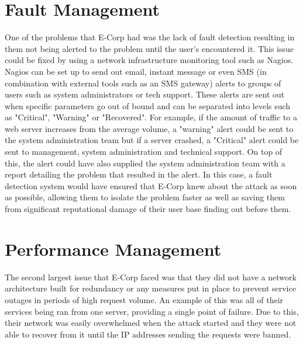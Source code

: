 \documentclass[]{report}
\begin{document}
\section*{Fault Management}
One of the problems that E-Corp had was the lack of fault detection resulting in them not being alerted to the problem until the user's encountered it. This issue could be fixed by using a network infrastructure monitoring tool such as Nagios. Nagios can be set up to send out email, instant message or even SMS (in combination with external tools such as an SMS gateway) alerts to groups of users such as system administrators or tech support. These alerts are sent out when specific parameters go out of bound and can be separated into levels such as "Critical", "Warning" or "Recovered". For example, if the amount of traffic to a web server increases from the average volume, a "warning" alert could be sent to the system administration team but if a server crashed, a "Critical" alert could be sent to management, system administration and technical support. On top of this, the alert could have also supplied the system administration team with a report detailing the problem that resulted in the alert. In this case, a fault detection system would have ensured that E-Corp knew about the attack as soon as possible, allowing them to isolate the problem faster as well as saving them from significant reputational damage of their user base finding out before them.

\section*{Performance Management}
The second largest issue that E-Corp faced was that they did not have a network architecture built for redundancy or any measures put in place to prevent service outages in periods of high request volume. An example of this was all of their services being ran from one server, providing a single point of failure. Due to this, their network was easily overwhelmed when the attack started and they were not able to recover from it until the IP addresses sending the requests were banned. 
\end{document}
